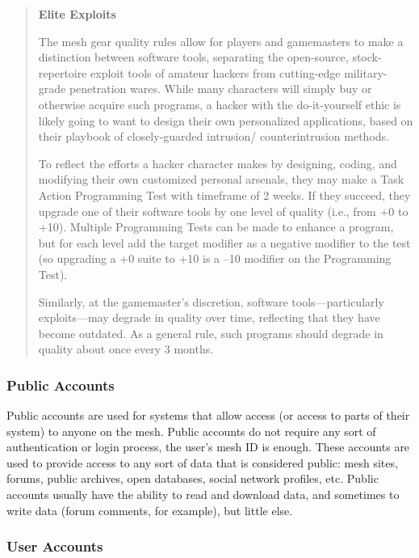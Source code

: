 \begin{quotation}
\textbf{Elite Exploits}

The mesh gear quality rules allow for players
and gamemasters to make a distinction between
software tools, separating the open-source,
stock-repertoire exploit tools of amateur hackers
from cutting-edge military-grade penetration
wares. While many characters will simply buy or
otherwise acquire such programs, a hacker with
the do-it-yourself ethic is likely going to want
to design their own personalized applications,
based on their playbook of closely-guarded intrusion/
counterintrusion methods.

To reflect the efforts a hacker character makes
by designing, coding, and modifying their own
customized personal arsenals, they may make a
Task Action Programming Test with timeframe
of 2 weeks. If they succeed, they upgrade one
of their software tools by one level of quality
(i.e., from +0 to +10). Multiple Programming
Tests can be made to enhance a program, but for
each level add the target modifier as a negative
modifier to the test (so upgrading a +0 suite to
+10 is a –10 modifier on the Programming Test).

Similarly, at the gamemaster’s discretion, software
tools—particularly exploits—may degrade
in quality over time, reflecting that they have
become outdated. As a general rule, such programs
should degrade in quality about once
every 3 months.
\end{quotation}

\subsubsection{Public Accounts}

Public accounts are used for systems that allow 
access (or access to parts of their system) to anyone 
on the mesh. Public accounts do not require any sort 
of authentication or login process, the user's mesh ID 
is enough. These accounts are used to provide access 
to any sort of data that is considered public: mesh 
sites, forums, public archives, open databases, social 
network profiles, etc. Public accounts usually have 
the ability to read and download data, and sometimes
to write data (forum comments, for example),
but little else.

\subsubsection{User Accounts}

